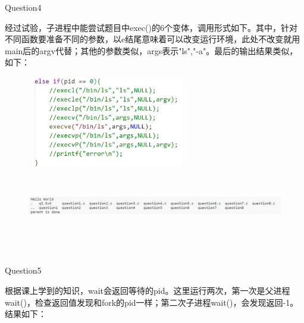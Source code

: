 \documentclass[12pt]{article}
\begin{document}
\newpage
\begin{large}
    \noindent Question4\\
\end{large}
\hspace*{2em}经过试验，子进程中能尝试题目中exec()的6个变体，调用形式如下。其中，针对不同函数要准备不同的参数，以e结尾意味着可以改变运行环境，此处不改变就用main后的argv代替；其他的参数类似，args表示"ls","-a"。最后的输出结果类似，如下：
\begin{figure}[h]
    \centering
    \includegraphics*[height=4cm,width=7cm]{HW2-12.jpg}
\end{figure}
\begin{figure}[h]
    \centering
    \includegraphics*[height=2.5cm,width=15cm]{HW2-11.jpg}
\end{figure}\\
\begin{large}
    \noindent Question5\\
\end{large}
\hspace*{2em}根据课上学到的知识，wait会返回等待的pid。这里运行两次，第一次是父进程wait()，检查返回值发现和fork的pid一样；第二次子进程wait()，会发现返回-1。结果如下：
\begin{figure}[!h]
    \centering
    \hfill
\end{figure}\\
\end{document}
